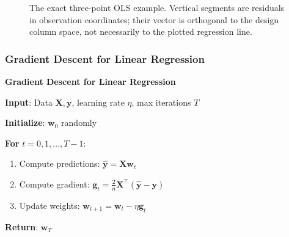 \documentclass[11pt,twoside]{article}
\numberwithin{equation}{section}
\newcommand{\vect}[1]{\bm{#1}}
\newcommand{\mat}[1]{\bm{#1}}
\theoremstyle{plain}
\theoremstyle{definition}
\theoremstyle{remark}
\begin{document}
\begin{figure}[H]
\centering
{}
\caption{The exact three-point OLS example. Vertical segments are residuals in observation coordinates; their vector is orthogonal to the design column space, not necessarily to the plotted regression line.}
\end{figure}

\subsubsection{Gradient Descent for Linear Regression}

\begin{algorithmbox}
\textbf{Gradient Descent for Linear Regression}

\textbf{Input}: Data $\mat{X}, \vect{y}$, learning rate $\eta$, max iterations $T$

\textbf{Initialize}: $\vect{w}_0$ randomly

\textbf{For} $t = 0, 1, \ldots, T-1$:
\begin{enumerate}
\item Compute predictions: $\hat{\vect{y}} = \mat{X}\vect{w}_t$
\item Compute gradient: $\vect{g}_t = \frac{2}{n}\mat{X}^\top(\hat{\vect{y}} - \vect{y})$
\item Update weights: $\vect{w}_{t+1} = \vect{w}_t - \eta \vect{g}_t$
\end{enumerate}

\textbf{Return}: $\vect{w}_T$
\end{algorithmbox}
\end{document}
